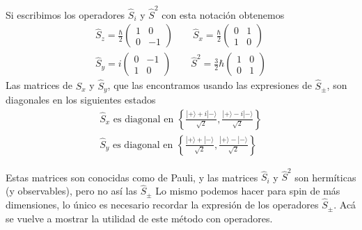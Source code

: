 Si escribimos los operadores $\hat{S}_i$ y $\hat{S}^2$ con esta notación obtenemos
\begin{equation}
    \begin{gathered}
        \hat{S}_z = \frac{\hbar}{2} \begin{pmatrix} 1 & 0 \\ 0 & -1 \end{pmatrix} \qquad
        \hat{S}_x = \frac{\hbar}{2}\begin{pmatrix} 0 & 1 \\ 1 & 0 \end{pmatrix}\\ 
    \hat{S}_y = i \begin{pmatrix} 0 & -1 \\ 1 & 0 \end{pmatrix} \qquad
    \hat{S}^2 = \frac{3}{2}\hbar \begin{pmatrix} 1 & 0 \\ 0 & 1 \end{pmatrix}
\end{gathered}
\end{equation}
Las matrices de $\hat{S}_x$ y $\hat{S}_y$, que las encontramos usando las expresiones de $\hat{S}_\pm$, son diagonales en los siguientes estados
\begin{equation}
    \begin{gathered}
    \hat{S}_x \text{ es  diagonal en } \left\{\frac{|+ \rangle + i |-\rangle}{\sqrt{2}}, \frac{|+\rangle - i |-\rangle}{\sqrt{2}}\right\} \\
    \hat{S}_y \text{ es  diagonal en } \left\{\frac{|+\rangle + |-\rangle}{\sqrt{2}}, \frac{|+\rangle - |-\rangle}{\sqrt{2}}\right\}
\end{gathered}
\end{equation}

Estas matrices son conocidas como de Pauli, y las matrices $\hat{S}_i$ y $\hat{S}^2$ son hermíticas (y observables), pero no así las $\hat{S}_\pm$
Lo mismo podemos hacer para spin de más dimensiones, lo único es necesario recordar la expresión de los operadores $\hat{S}_\pm$.
Acá se vuelve a mostrar la utilidad de este método con operadores.

